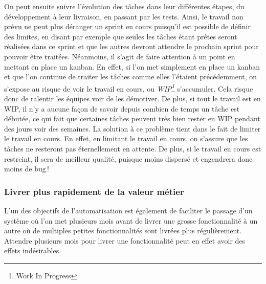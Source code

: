 On peut ensuite suivre l'évolution des tâches dans leur différentes étapes, du développement à leur livraison, en passant par les tests. Ainsi, le travail non prévu ne peut plus déranger un sprint en cours puisqu'il est possible de définir des limites, en disant par exemple que seules les tâches étant prêtes seront réalisées dans ce sprint et que les autres devront attendre le prochain sprint pour pouvoir être traitées. Néanmoins, il s'agit de faire attention à un point en mettant en place un kanban. En effet, si l'on met simplement en place un kanban et que l'on continue de traiter les tâches comme elles l'étaient précédemment, on s'expose au risque de voir le travail en cours, ou \emph{WIP\footnote{Work In Progress}} s'accumuler. Cela risque donc de ralentir les équipes voir de les démotiver. De plus, si tout le travail est en WIP, il n'y a aucune façon de savoir depuis combien de temps un tâche est débutée, ce qui fait que certaines tâches peuvent très bien rester en WIP pendant des jours voir des semaines. La solution à ce problème tient dans le fait de limiter le travail en cours. En effet, en limitant le travail en cours, on s'assure que les tâches ne resteront pas éternellement en attente. De plus, si le travail en cours est restreint, il sera de meilleur qualité, puisque moins dispersé et engendrera donc moins de bug !

\subsubsection{Livrer plus rapidement de la valeur métier}

L'un des objectifs de l'automatisation est également de faciliter le passage d'un système où l'on met plusieurs mois avant de livrer une grosse fonctionnalité à un autre où de multiples petites fonctionnalités sont livrées plus régulièrement. Attendre plusieurs mois pour livrer une fonctionnalité peut en effet avoir des effets indésirables.

